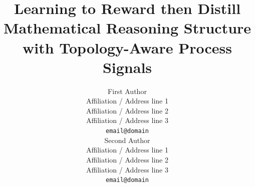 \documentclass[11pt]{article}
\title{Learning to Reward then Distill Mathematical Reasoning Structure with Topology-Aware Process Signals}
\author{First Author \\
  Affiliation / Address line 1 \\
  Affiliation / Address line 2 \\
  Affiliation / Address line 3 \\
  \texttt{email@domain} \\\And
  Second Author \\
  Affiliation / Address line 1 \\
  Affiliation / Address line 2 \\
  Affiliation / Address line 3 \\
  \texttt{email@domain} \\}
\begin{document}
\maketitle










\appendix
\clearpage
\onecolumn

\end{document}
